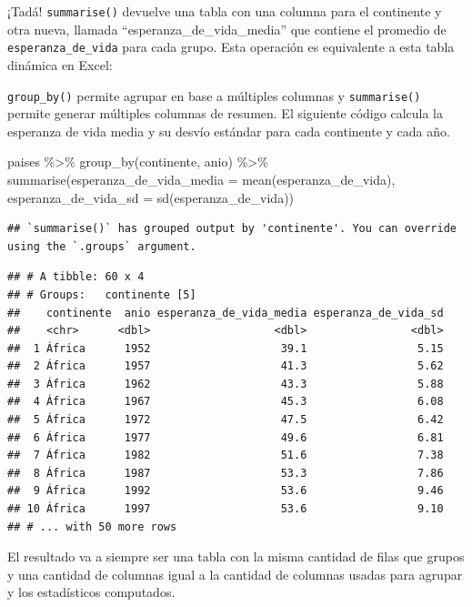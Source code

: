 \documentclass[
  openany]{book}
\newenvironment{Shaded}{\begin{snugshade}}{\end{snugshade}}
\newcommand{\AttributeTok}[1]{\textcolor[rgb]{0.77,0.63,0.00}{#1}}
\newcommand{\FunctionTok}[1]{\textcolor[rgb]{0.00,0.00,0.00}{#1}}
\newcommand{\NormalTok}[1]{#1}
\newcommand{\SpecialCharTok}[1]{\textcolor[rgb]{0.00,0.00,0.00}{#1}}
\begin{document}
¡Tadá!
\texttt{summarise()} devuelve una tabla con una columna para el continente y otra nueva, llamada ``esperanza\_de\_vida\_media'' que contiene el promedio de \texttt{esperanza\_de\_vida} para cada grupo.
Esta operación es equivalente a esta tabla dinámica en Excel:

\texttt{group\_by()} permite agrupar en base a múltiples columnas y \texttt{summarise()} permite generar múltiples columnas de resumen.
El siguiente código calcula la esperanza de vida media y su desvío estándar para cada continente y cada año.

\begin{Shaded}
\begin{Highlighting}[]
\NormalTok{paises }\SpecialCharTok{\%\textgreater{}\%} 
  \FunctionTok{group\_by}\NormalTok{(continente, anio) }\SpecialCharTok{\%\textgreater{}\%} 
  \FunctionTok{summarise}\NormalTok{(}\AttributeTok{esperanza\_de\_vida\_media =} \FunctionTok{mean}\NormalTok{(esperanza\_de\_vida),}
            \AttributeTok{esperanza\_de\_vida\_sd =} \FunctionTok{sd}\NormalTok{(esperanza\_de\_vida))}
\end{Highlighting}
\end{Shaded}

\begin{verbatim}
## `summarise()` has grouped output by 'continente'. You can override using the `.groups` argument.
\end{verbatim}

\begin{verbatim}
## # A tibble: 60 x 4
## # Groups:   continente [5]
##    continente  anio esperanza_de_vida_media esperanza_de_vida_sd
##    <chr>      <dbl>                   <dbl>                <dbl>
##  1 África      1952                    39.1                 5.15
##  2 África      1957                    41.3                 5.62
##  3 África      1962                    43.3                 5.88
##  4 África      1967                    45.3                 6.08
##  5 África      1972                    47.5                 6.42
##  6 África      1977                    49.6                 6.81
##  7 África      1982                    51.6                 7.38
##  8 África      1987                    53.3                 7.86
##  9 África      1992                    53.6                 9.46
## 10 África      1997                    53.6                 9.10
## # ... with 50 more rows
\end{verbatim}

El resultado va a siempre ser una tabla con la misma cantidad de filas que grupos y una cantidad de columnas igual a la cantidad de columnas usadas para agrupar y los estadísticos computados.
\end{document}
